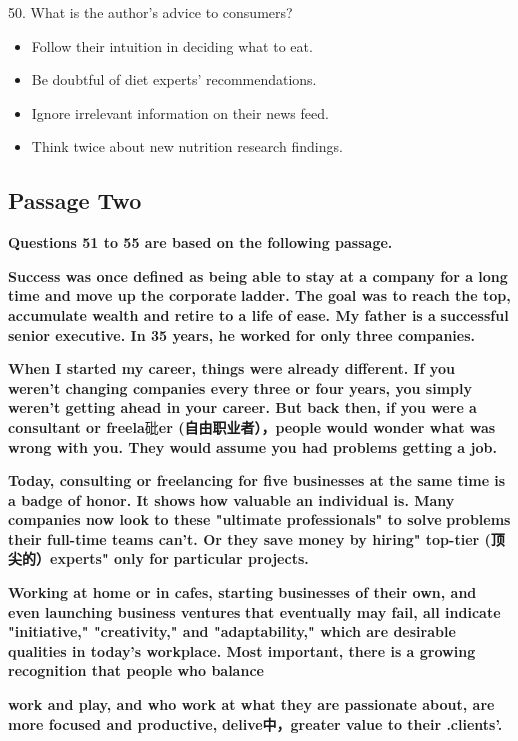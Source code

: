 \documentclass[UTF8,11pt]{ctexart}
\begin{document}
50. What is the author's advice to consumers?


\begin{itemize}[leftmargin=2em,itemsep=.2em,topsep=.4em]\item[A.] Follow their intuition in deciding what to eat.
\item[B.] Be doubtful of diet experts' recommendations.
\item[C.] Ignore irrelevant information on their news feed.
\item[D.] Think twice about new nutrition research findings.
\end{itemize}

\subsection*{\textbf{Passage Two}}


\textbf{Questions 51 to 55 are based on the following passage.}


\textbf{Success was once defined as being able to stay at a company for a long time and move up the corporate} \textbf{ladder. The goal was to reach the top, accumulate wealth and retire to a life of ease. My father is a} \textbf{successful senior executive. In 35 years, he worked for only three companies.}


\textbf{When I started my career, things were already different. If you weren't changing companies every} \textbf{three or four years, you simply weren't getting ahead in your career. But back then, if you were a} \textbf{consultant or freela}砒\textbf{er (自由职业者），people would wonder what was wrong with you. They would} \textbf{assume you had problems getting a job.}


\textbf{Today, consulting or freelancing for five businesses at the same time is a badge of honor. It shows} \textbf{how valuable an individual is. Many companies now look to these "ultimate professionals" to solve} \textbf{problems their full-time teams can't. Or they save money by hiring" top-tier (顶尖的）experts" only for} \textbf{particular projects.}


\textbf{Working at home or in cafes, starting businesses of their own, and even launching business ventures} \textbf{that eventually may fail, all indicate "initiative," "creativity," and "adaptability," which are desirable} \textbf{qualities in today's workplace. Most important, there is a growing recognition that people who balance}


\textbf{work and play, and who work at what they are passionate about, are more focused and productive,} \textbf{delive中，greater value to their .clients'.}
\end{document}
